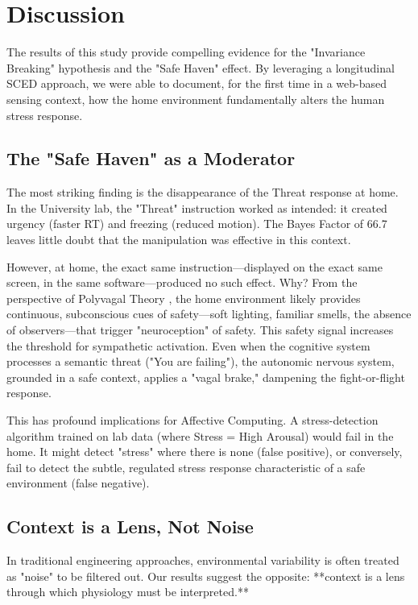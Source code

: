 \section{Discussion}

The results of this study provide compelling evidence for the "Invariance Breaking" hypothesis and the "Safe Haven" effect. By leveraging a longitudinal SCED approach, we were able to document, for the first time in a web-based sensing context, how the home environment fundamentally alters the human stress response.

\subsection{The "Safe Haven" as a Moderator}
The most striking finding is the disappearance of the Threat response at home. In the University lab, the "Threat" instruction worked as intended: it created urgency (faster RT) and freezing (reduced motion). The Bayes Factor of 66.7 leaves little doubt that the manipulation was effective in this context. 

However, at home, the exact same instruction—displayed on the exact same screen, in the same software—produced no such effect. Why?
From the perspective of Polyvagal Theory \cite{porges_safe_haven}, the home environment likely provides continuous, subconscious cues of safety—soft lighting, familiar smells, the absence of observers—that trigger "neuroception" of safety. This safety signal increases the threshold for sympathetic activation. Even when the cognitive system processes a semantic threat ("You are failing"), the autonomic nervous system, grounded in a safe context, applies a "vagal brake," dampening the fight-or-flight response. 

This has profound implications for Affective Computing. A stress-detection algorithm trained on lab data (where Stress = High Arousal) would fail in the home. It might detect "stress" where there is none (false positive), or conversely, fail to detect the subtle, regulated stress response characteristic of a safe environment (false negative).

\subsection{Context is a Lens, Not Noise}
In traditional engineering approaches, environmental variability is often treated as "noise" to be filtered out. Our results suggest the opposite: **context is a lens through which physiology must be interpreted.**

